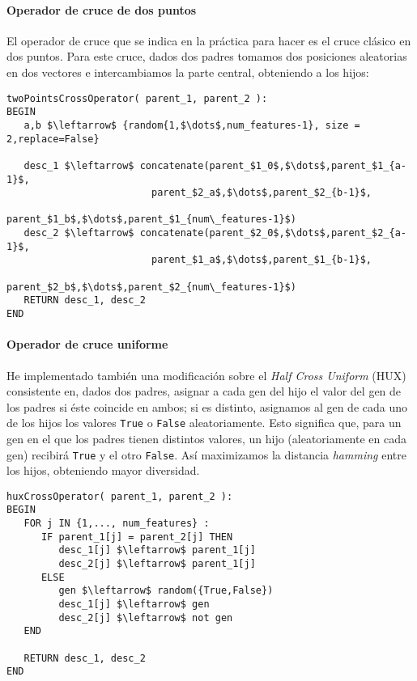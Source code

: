 \documentclass[11pt,leqno]{article}
\begin{document}
\paragraph{Operador de cruce de dos puntos}

	El operador de cruce que se indica en la práctica para hacer es el cruce clásico en dos puntos. Para este cruce, dados dos padres tomamos dos posiciones aleatorias en dos vectores e intercambiamos la parte central, obteniendo a los hijos:
	
\begin{lstlisting}[mathescape=true]
twoPointsCrossOperator( parent_1, parent_2 ):
BEGIN
   a,b $\leftarrow$ {random{1,$\dots$,num_features-1}, size = 2,replace=False}

   desc_1 $\leftarrow$ concatenate(parent_$1_0$,$\dots$,parent_$1_{a-1}$,
                         parent_$2_a$,$\dots$,parent_$2_{b-1}$,
                         parent_$1_b$,$\dots$,parent_$1_{num\_features-1}$)
   desc_2 $\leftarrow$ concatenate(parent_$2_0$,$\dots$,parent_$2_{a-1}$,
                         parent_$1_a$,$\dots$,parent_$1_{b-1}$,
                         parent_$2_b$,$\dots$,parent_$2_{num\_features-1}$)
   RETURN desc_1, desc_2
END

\end{lstlisting}
	
\paragraph{Operador de cruce uniforme}

	He implementado también una modificación sobre el \textit{Half Cross Uniform} (HUX) consistente en, dados dos padres, asignar a cada gen del hijo el valor del gen de los padres si éste coincide en ambos; si es distinto, asignamos al gen de cada uno de los hijos los valores \texttt{True} o \texttt{False} aleatoriamente. Esto significa que, para un gen en el que los padres tienen distintos valores, un hijo (aleatoriamente en cada gen) recibirá \texttt{True} y el otro \texttt{False}. Así maximizamos la distancia \textit{hamming} entre los hijos, obteniendo mayor diversidad. 
	
\begin{lstlisting}[mathescape=true]
huxCrossOperator( parent_1, parent_2 ):
BEGIN
   FOR j IN {1,..., num_features} :
      IF parent_1[j] = parent_2[j] THEN
         desc_1[j] $\leftarrow$ parent_1[j]
         desc_2[j] $\leftarrow$ parent_1[j]
      ELSE
         gen $\leftarrow$ random({True,False})
         desc_1[j] $\leftarrow$ gen     
         desc_2[j] $\leftarrow$ not gen
   END
   
   RETURN desc_1, desc_2
END
\end{lstlisting}
	
\end{document}
